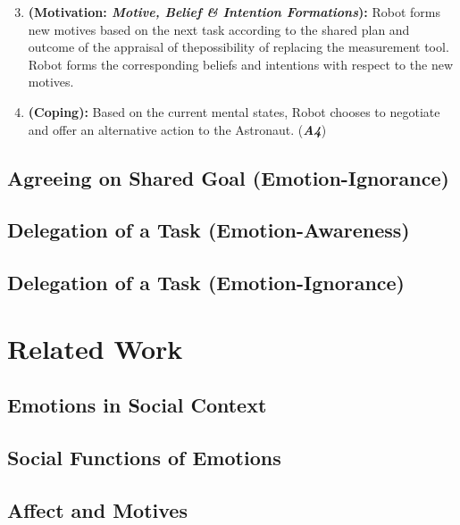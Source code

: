 \begin{enumerate}
  \setcounter{enumi}{2}
  \item \textbf{(Motivation: \textit{Motive, Belief \& Intention Formations}):}
  Robot forms new motives based on the next task according to the shared plan
  and outcome of the appraisal of thepossibility of replacing the measurement
  tool. Robot forms the corresponding beliefs and intentions with respect to
  the new motives.\\
\end{enumerate}

\begin{enumerate}
  \setcounter{enumi}{3}
  \item \textbf{(Coping):} Based on the current mental states, Robot chooses to
  negotiate and offer an alternative action to the Astronaut.
  (\textit{\textbf{A4}})
\end{enumerate}

\subsection{Agreeing on Shared Goal (Emotion-Ignorance)}
\label{sec:wt-exp2}

\subsection{Delegation of a Task (Emotion-Awareness)}
\label{sec:wt-exp3}

\subsection{Delegation of a Task (Emotion-Ignorance)}
\label{sec:wt-exp4}

\section{Related Work}

\subsection{Emotions in Social Context}

\subsection{Social Functions of Emotions}

\subsection{Affect and Motives}

